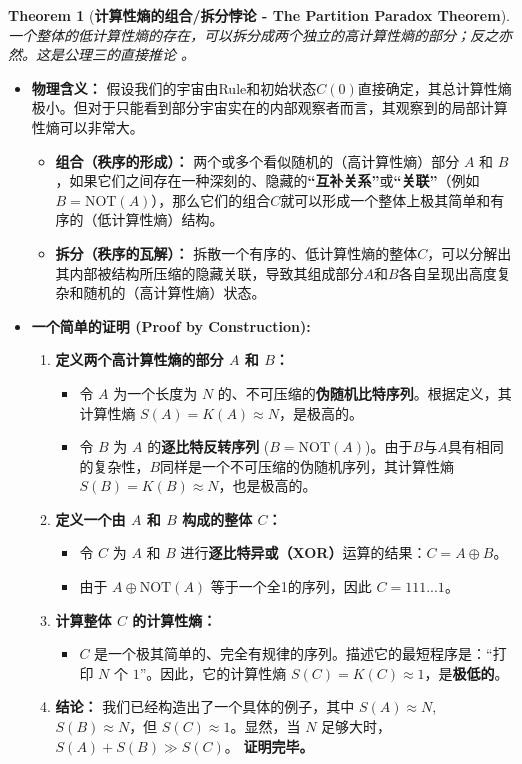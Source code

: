 \documentclass[11pt, a4paper]{article}
\newtheorem{theorem}{Theorem}[section]
\begin{document}
\begin{theorem}[\textbf{计算性熵的组合/拆分悖论 - The Partition Paradox Theorem}]
一个整体的低计算性熵的存在，可以拆分成两个独立的高计算性熵的部分；反之亦然。这是公理三的直接推论 \cite{Kolmogorov1965}。
\end{theorem}
\begin{itemize}
    \item \textbf{物理含义：} 假设我们的宇宙由Rule和初始状态$C(0)$直接确定，其总计算性熵极小。但对于只能看到部分宇宙实在的内部观察者而言，其观察到的局部计算性熵可以非常大。
    \begin{itemize}
        \item \textbf{组合（秩序的形成）：} 两个或多个看似随机的（高计算性熵）部分 $A$ 和 $B$，如果它们之间存在一种深刻的、隐藏的\textbf{“互补关系”}或\textbf{“关联”}（例如 $B = \text{NOT}(A)$），那么它们的组合$C$就可以形成一个整体上极其简单和有序的（低计算性熵）结构。
        \item \textbf{拆分（秩序的瓦解）：} 拆散一个有序的、低计算性熵的整体$C$，可以分解出其内部被结构所压缩的隐藏关联，导致其组成部分$A$和$B$各自呈现出高度复杂和随机的（高计算性熵）状态。
    \end{itemize}
    \item \textbf{一个简单的证明 (Proof by Construction):}
    \begin{enumerate}
        \item \textbf{定义两个高计算性熵的部分 $A$ 和 $B$：}
            \begin{itemize}
                \item 令 $A$ 为一个长度为 $N$ 的、不可压缩的\textbf{伪随机比特序列}。根据定义，其计算性熵 $S(A) = K(A) \approx N$，是极高的。
                \item 令 $B$ 为 $A$ 的\textbf{逐比特反转序列} ($B = \text{NOT}(A)$)。由于$B$与$A$具有相同的复杂性，$B$同样是一个不可压缩的伪随机序列，其计算性熵 $S(B) = K(B) \approx N$，也是极高的。
            \end{itemize}
        \item \textbf{定义一个由 $A$ 和 $B$ 构成的整体 $C$：}
            \begin{itemize}
                \item 令 $C$ 为 $A$ 和 $B$ 进行\textbf{逐比特异或（XOR）}运算的结果：$C = A \oplus B$。
                \item 由于 $A \oplus \text{NOT}(A)$ 等于一个全1的序列，因此 $C = 111...1$。
            \end{itemize}
        \item \textbf{计算整体 $C$ 的计算性熵：}
            \begin{itemize}
                \item $C$ 是一个极其简单的、完全有规律的序列。描述它的最短程序是：“打印 $N$ 个 $1$”。因此，它的计算性熵 $S(C) = K(C) \approx 1$，是\textbf{极低的}。
            \end{itemize}
        \item \textbf{结论：} 我们已经构造出了一个具体的例子，其中 $S(A) \approx N$, $S(B) \approx N$，但 $S(C) \approx 1$。显然，当 $N$ 足够大时，$S(A) + S(B) \gg S(C)$。
            \textbf{证明完毕。}
    \end{enumerate}
\end{itemize}
\end{document}
